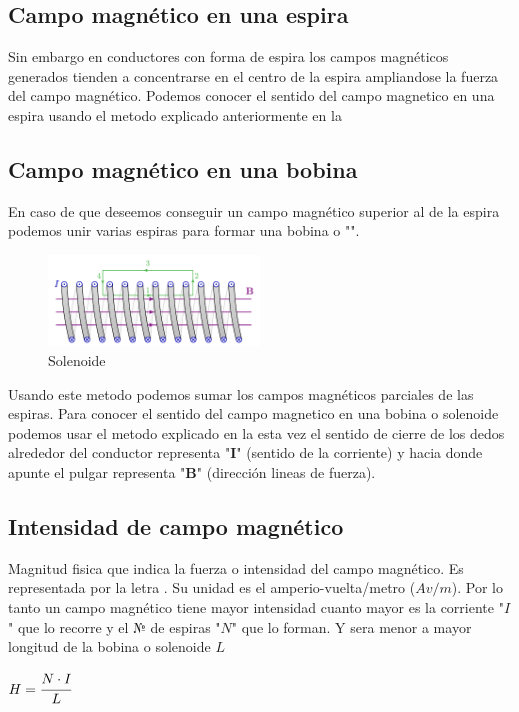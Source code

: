 \documentclass{report}
\begin{document}
  \subsection{Campo magnético en una espira}\label{ssec:espira}
Sin embargo en conductores con forma de espira los campos magnéticos generados tienden a concentrarse en el centro de la espira 
ampliandose la fuerza del campo magnético. Podemos conocer el sentido del campo magnetico en una espira usando el metodo
explicado anteriormente en la 


  \subsection{Campo magnético en una bobina }\label{ssec:bobina}
En caso de que deseemos conseguir un campo magnético superior al de la espira
podemos unir varias espiras para formar una bobina o "". {\hspace*{\fill}}
\begin{figure}
  \includegraphics[width=0.5\textwidth]{magnetic_field_solenoid.pdf} 
  \caption{Solenoide}
  \label{fig:solenoide}
\end{figure}
Usando este metodo podemos sumar los campos magnéticos parciales de las espiras. 
Para conocer el sentido del campo magnetico en una bobina o solenoide podemos usar el metodo explicado en la {}
esta vez el sentido de cierre de los dedos alrededor del conductor representa "\(\mathbf{I}\)" (sentido de la corriente) 
y hacia donde apunte el pulgar representa "\(\mathbf{B}\)" (dirección lineas de fuerza).\hfill
\fspace{2em}
\subsection{Intensidad de campo magnético}\label{ssec:intensidad_de_campo_magnético}
Magnitud fisica que indica la fuerza o intensidad del campo magnético. Es representada por la letra . Su unidad es el amperio-vuelta/metro (\(Av/m \)).\fspace{1em} 
Por lo tanto un campo magnético tiene mayor intensidad cuanto mayor es la corriente "\(I\)" que lo recorre y el № de espiras "\(N\)" que lo forman.
Y sera menor a mayor longitud de la bobina o solenoide \(L\)
\begin{center}
  \label{eq:intensidad_campo_magnetico}
  \begin{math}
    H = \cfrac{N \cdot I}{L}
  \end{math}
  
\end{center}
\end{document}
